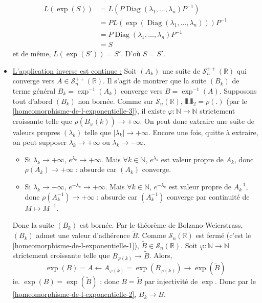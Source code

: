 \begin{demonstration}
\begin{itemize}
			\begin{align*}
				L(\exp(S)) &= L(P \operatorname{Diag}(\lambda_1, \dots, \lambda_n) P^{-1}) \\
				&= P L(\exp(\operatorname{Diag}(\lambda_1, \dots, \lambda_n))) P^{-1} \\
				&= P \operatorname{Diag}(\lambda_1, \dots, \lambda_n) P^{-1} \\
				&= S
			\end{align*}
			et de même, $L(\exp(S')) = S'$. D'où $S = S'$.
			\item \uline{L'application inverse est continue :} Soit $(A_k)$ une suite de $\mathcal{S}^{++}_n(\mathbb{R})$ qui converge vers $A \in \mathcal{S}^{++}_n(\mathbb{R})$. Il s'agit de montrer que la suite $(B_k)$ de terme général $B_k = \exp^{-1}(A_k)$ converge vers $B = \exp^{-1}(A)$. Supposons tout d'abord $(B_k)$ non bornée. Comme sur $\mathcal{S}_n(\mathbb{R})$, $\VERT . \VERT_2 = \rho(.)$ (par le \cref{homeomorphisme-de-l-exponentielle-3}), il existe $\varphi : \mathbb{N} \rightarrow \mathbb{N}$ strictement croissante telle que $\rho(B_\varphi(k)) \longrightarrow +\infty$. On peut donc extraire une suite de valeurs propres $(\lambda_k)$ telle que $|\lambda_k| \longrightarrow +\infty$. Encore une fois, quitte à extraire, on peut supposer $\lambda_k \longrightarrow +\infty$ ou $\lambda_k \longrightarrow -\infty$.
			\begin{itemize}
				\item Si $\lambda_k \longrightarrow +\infty$, $e^{\lambda_k} \longrightarrow +\infty$. Mais $\forall k \in \mathbb{N}$, $e^{\lambda_k}$ est valeur propre de $A_k$, donc $\rho(A_k) \longrightarrow +\infty$ : absurde car $(A_k)$ converge.
				\item Si $\lambda_k \longrightarrow -\infty$, $e^{-\lambda_k} \longrightarrow +\infty$. Mais $\forall k \in \mathbb{N}$, $e^{-\lambda_k}$ est valeur propre de $A_k^{-1}$, donc $\rho(A_k^{-1}) \longrightarrow +\infty$ : absurde car $(A_k^{-1})$ converge par continuité de $M \mapsto M^{-1}$.
			\end{itemize}
			Donc la suite $(B_k)$ est bornée. Par le théorème de Bolzano-Weierstrass, $(B_k)$ admet une valeur d'adhérence $\widetilde{B}$. Comme $\mathcal{S}_n(\mathbb{R})$ est fermé (c'est le \cref{homeomorphisme-de-l-exponentielle-1}), $\widetilde{B} \in \mathcal{S}_n(\mathbb{R})$.
			\newpar
			Soit $\varphi : \mathbb{N} \rightarrow \mathbb{N}$ strictement croissante telle que $B_{\varphi(k)} \longrightarrow \widetilde{B}$. Alors,
			\[ \exp(B) = A \longleftarrow A_{\varphi(k)} = \exp(B_{\varphi(k)}) \longrightarrow \exp(\widetilde{B}) \]
			ie. $\exp(B) = \exp(\widetilde{B})$ ; donc $B = \widetilde{B}$ par injectivité de $\exp$. Donc par le \cref{homeomorphisme-de-l-exponentielle-2}, $B_k \longrightarrow B$.
		\end{itemize}
	\end{demonstration}

